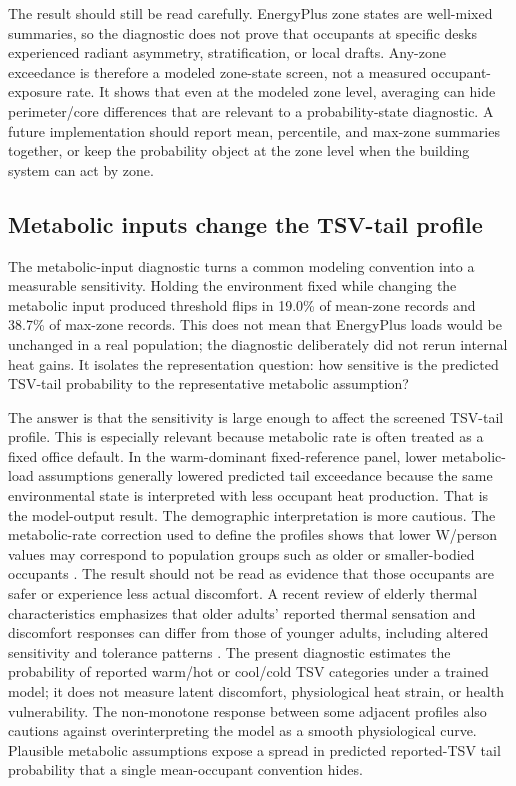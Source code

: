 The result should still be read carefully. EnergyPlus zone states are well-mixed summaries, so the diagnostic does not prove that occupants at specific desks experienced radiant asymmetry, stratification, or local drafts. Any-zone exceedance is therefore a modeled zone-state screen, not a measured occupant-exposure rate. It shows that even at the modeled zone level, averaging can hide perimeter/core differences that are relevant to a probability-state diagnostic. A future implementation should report mean, percentile, and max-zone summaries together, or keep the probability object at the zone level when the building system can act by zone.

\subsection{Metabolic inputs change the TSV-tail profile}

The metabolic-input diagnostic turns a common modeling convention into a measurable sensitivity. Holding the environment fixed while changing the metabolic input produced threshold flips in 19.0\% of mean-zone records and 38.7\% of max-zone records. This does not mean that EnergyPlus loads would be unchanged in a real population; the diagnostic deliberately did not rerun internal heat gains. It isolates the representation question: how sensitive is the predicted TSV-tail probability to the representative metabolic assumption?

The answer is that the sensitivity is large enough to affect the screened TSV-tail profile. This is especially relevant because metabolic rate is often treated as a fixed office default. In the warm-dominant fixed-reference panel, lower metabolic-load assumptions generally lowered predicted tail exceedance because the same environmental state is interpreted with less occupant heat production. That is the model-output result. The demographic interpretation is more cautious. The metabolic-rate correction used to define the profiles shows that lower W/person values may correspond to population groups such as older or smaller-bodied occupants \citep{Guo2025Correcting120W}. The result should not be read as evidence that those occupants are safer or experience less actual discomfort. A recent review of elderly thermal characteristics emphasizes that older adults' reported thermal sensation and discomfort responses can differ from those of younger adults, including altered sensitivity and tolerance patterns \citep{Xu2025ElderlyThermalReview}. The present diagnostic estimates the probability of reported warm/hot or cool/cold TSV categories under a trained model; it does not measure latent discomfort, physiological heat strain, or health vulnerability. The non-monotone response between some adjacent profiles also cautions against overinterpreting the model as a smooth physiological curve. Plausible metabolic assumptions expose a spread in predicted reported-TSV tail probability that a single mean-occupant convention hides.

